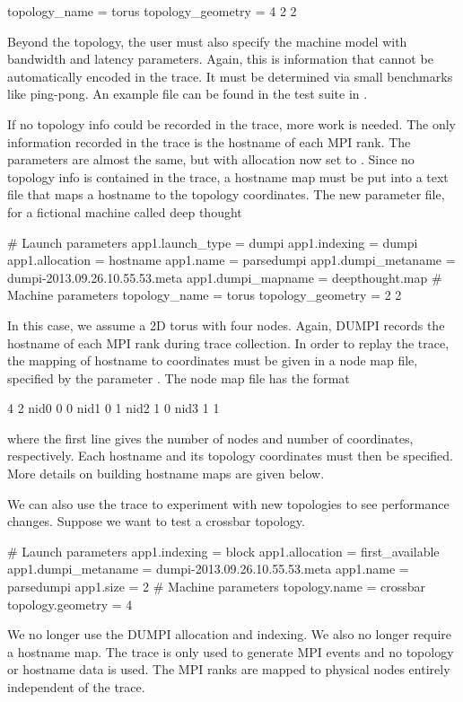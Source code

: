 \begin{ViFile}
topology_name = torus
topology_geometry = 4 2 2
\end{ViFile}
Beyond the topology, the user must also specify the machine model with bandwidth and latency parameters.
Again, this is information that cannot be automatically encoded in the trace.
It must be determined via small benchmarks like ping-pong.
An example file can be found in the test suite in .

If no topology info could be recorded in the trace, more work is needed.
The only information recorded in the trace is the hostname of each MPI rank.
The parameters are almost the same, but with allocation now set to .
Since no topology info is contained in the trace, 
a hostname map must be put into a text file that maps a hostname to the topology coordinates.
The new parameter file, for a fictional machine called deep thought

\begin{ViFile}
# Launch parameters
app1.launch_type = dumpi
app1.indexing = dumpi
app1.allocation = hostname
app1.name = parsedumpi
app1.dumpi_metaname = dumpi-2013.09.26.10.55.53.meta
app1.dumpi_mapname = deepthought.map
# Machine parameters
topology_name = torus
topology_geometry = 2 2
\end{ViFile}


In this case, we assume a 2D torus with four nodes.
Again, DUMPI records the hostname of each MPI rank during trace collection.
In order to replay the trace, the mapping of hostname to coordinates must be given in a node map file,
specified by the parameter .
The node map file has the format

\begin{ViFile}
4 2
nid0 0 0
nid1 0 1
nid2 1 0
nid3 1 1
\end{ViFile}
where the first line gives the number of nodes and number of coordinates, respectively.
Each hostname and its topology coordinates must then be specified.
More details on building hostname maps are given below.

We can also use the trace to experiment with new topologies to see performance changes.
Suppose we want to test a crossbar topology.

\begin{ViFile}
# Launch parameters
app1.indexing = block
app1.allocation = first_available
app1.dumpi_metaname = dumpi-2013.09.26.10.55.53.meta
app1.name = parsedumpi
app1.size = 2
# Machine parameters
topology.name = crossbar
topology.geometry = 4
\end{ViFile}
We no longer use the DUMPI allocation and indexing. 
We also no longer require a hostname map.
The trace is only used to generate MPI events and no topology or hostname data is used.
The MPI ranks are mapped to physical nodes entirely independent of the trace.

